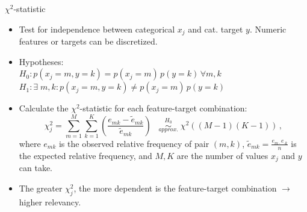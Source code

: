\documentclass[11pt,compress,t,notes=noshow, xcolor=table]{beamer}
\begin{document}
  \begin{vbframe}{$\chi^2$-statistic}
  \begin{itemize}
    \item Test for independence between categorical $x_j$ and cat. target $y$. Numeric features or targets can be discretized.
    \item Hypotheses: \\
    $H_0: p(x_j = m, y = k) = p(x_j = m)\, p(y = k) \,\forall m, k$\\


    $H_1: \exists \; m, k: p(x_j = m, y = k) \neq p(x_j = m)\, p(y = k)$
    \item Calculate the $\chi^2$-statistic for each feature-target combination:
      $$ \chi_j^2 = \sum_{m = 1}^{M} \sum_{k=1}^{K} (\frac{e_{mk} - \tilde{e}_{mk}}{\tilde{e}_{mk}}) \;\;\;   \stackrel{H_0}{\underset{approx.}{\sim}} \; \chi^2 ((M-1)(K-1))\,,$$
    where $e_{mk}$ is the observed relative frequency of pair $(m,k)$, $\tilde{e}_{mk} = \frac{e_{m \cdot} e_{\cdot k}}{n}$ is the expected relative frequency, and $M,K$ are the number of values $x_j$ and $y$ can take.
    \item The greater $\chi_j^2$, the more dependent is the feature-target combination $\rightarrow$ higher relevancy.
  \end{itemize}
  \end{vbframe}
\end{document}
